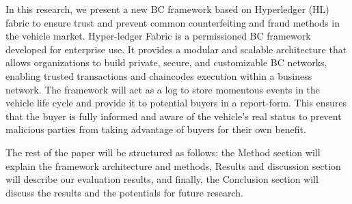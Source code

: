 In this research, we present a new BC framework based on Hyperledger (HL) fabric to ensure trust and prevent common counterfeiting and fraud
methods in the vehicle market. Hyper-ledger Fabric is a permissioned BC framework developed for enterprise use. It provides a modular and
scalable architecture that allows organizations to build private, secure, and customizable BC networks, enabling trusted transactions and
chaincodes execution within a business network. The framework will act as a log to store momentous events in the vehicle life cycle and
provide it to potential buyers in a report-form. This ensures that the buyer is fully informed and aware of the vehicle's real status to
prevent malicious parties from taking advantage of buyers for their own benefit.

The rest of the paper will be structured as follows: the Method section will explain the framework architecture and methods,
Results and discussion section will describe our evaluation results, and
finally, the Conclusion section will discuss the results and the potentials for future research.

